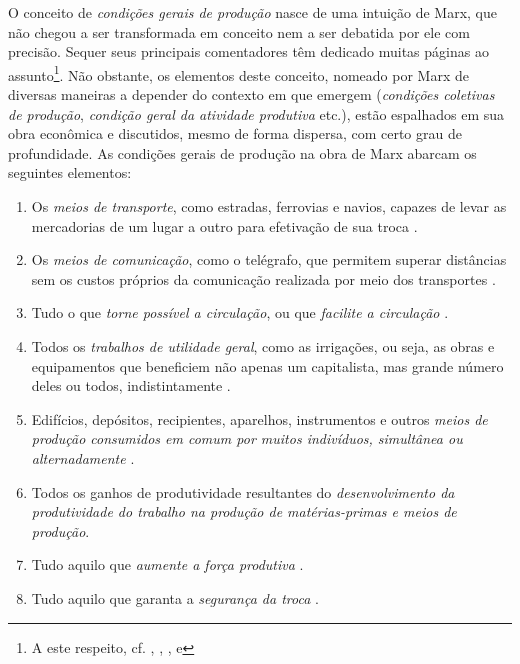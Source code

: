 O conceito de \textit{condições gerais de produção} nasce de uma intuição de Marx, que não chegou a ser transformada em conceito nem a ser debatida por ele com precisão. Sequer seus principais comentadores têm dedicado muitas páginas ao assunto\footnote{A este respeito, cf. , , ,  e }. Não obstante, os elementos deste conceito, nomeado por Marx de diversas maneiras a depender do contexto em que emergem (\textit{condições coletivas de produção}, \textit{condição geral da atividade produtiva} etc.), estão espalhados em sua obra econômica e discutidos, mesmo de forma dispersa, com certo grau de profundidade. As condições gerais de produção na obra de Marx abarcam os seguintes elementos:

\begin{enumerate}
\item Os \textit{meios de transporte}, como estradas, ferrovias e navios, capazes de levar as mercadorias de um lugar a outro para efetivação de sua troca \cite[p.~522]{MARX2013}.
\item Os \textit{meios de comunicação}, como o telégrafo, que permitem superar distâncias sem os custos próprios da comunicação realizada por meio dos transportes \cite[p.~457-458]{MARX2013}.
\item Tudo o que \textit{torne possível a circulação}, ou que \textit{facilite a circulação} \cite[p.~438]{MARX2011}.
\item Todos os \textit{trabalhos de utilidade geral}, como as irrigações, ou seja, as obras e equipamentos que beneficiem não apenas um capitalista, mas grande número deles ou todos, indistintamente \cite[p.~438]{MARX2011}.
\item Edifícios, depósitos, recipientes, aparelhos, instrumentos e outros \textit{meios de produção consumidos em comum por muitos indivíduos, simultânea ou alternadamente} \cite[p.~399-400]{MARX2013}.
\item Todos os ganhos de produtividade resultantes do \textit{desenvolvimento da produtividade do trabalho na produção de matérias-primas e meios de produção}.
\item Tudo aquilo que \textit{aumente a força produtiva} \cite[p.~114]{MARX2008}.
\item Tudo aquilo que garanta a \textit{segurança da troca} \cite[p.~432-433]{MARX2011}.
\end{enumerate}

